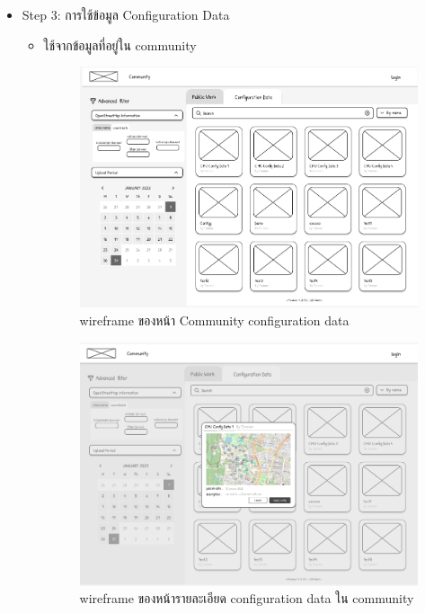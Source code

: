\begin{mypara}
\begin{itemize}
\begin{figure}[H]
    {guest_login.png}
    \caption{wireframe ของหน้า Guest decision}
    \label{fig:WireframeGuestDecision}
    \end{figure}
    \item Step 3: การใช้ข้อมูล Configuration Data
    \begin{itemize}
        \item ใช้จากข้อมูลที่อยู่ใน community
        \begin{figure}[H]
        \centering
        \includegraphics[scale=0.4]{conf_commu_guest.png}
        \caption{wireframe ของหน้า Community configuration data}
        \label{fig:WireframeCommunityConfigGuest}
        \end{figure}

        \begin{figure}[H]
        \centering
        \includegraphics[scale=0.4]{conf_commu_detail_guest.png}
        \caption{wireframe ของหน้ารายละเอียด configuration data ใน community}
        \label{fig:WireframeCommunityConfigDetailGuest}
        \end{figure}


\end{itemize}
\end{itemize}
\end{mypara}
